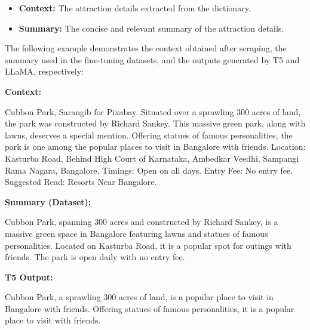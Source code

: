 \documentclass[sigconf,authordraft]{acmart}
\begin{document}
    \begin{itemize}
      \item \textbf{Context:} The attraction details extracted from the dictionary.
      \item \textbf{Summary:} The concise and relevant summary of the attraction details.
    \end{itemize}

    The following example demonstrates the context obtained after scraping, the summary used in the fine-tuning datasets, and the outputs generated by T5 and LLaMA, respectively:

    \begin{tcolorbox}[linewidth=1pt, innerleftmargin=15pt, innerrightmargin=15pt, innertopmargin=15pt, innerbottommargin=15pt]
      \textbf{Context:}

      Cubbon Park, Sarangib for Pixabay. Situated over a sprawling 300 acres of land, the park was constructed by Richard Sankey. This massive green park, along with lawns, deserves a special mention. Offering statues of famous personalities, the park is one among the popular places to visit in Bangalore with friends. Location: Kasturba Road, Behind High Court of Karnataka, Ambedkar Veedhi, Sampangi Rama Nagara, Bangalore. Timings: Open on all days. Entry Fee: No entry fee. Suggested Read: Resorts Near Bangalore.
    \end{tcolorbox}

    \begin{tcolorbox}[linewidth=1pt, innerleftmargin=15pt, innerrightmargin=15pt, innertopmargin=15pt, innerbottommargin=15pt]
      \textbf{Summary (Dataset):}

      Cubbon Park, spanning 300 acres and constructed by Richard Sankey, is a massive green space in Bangalore featuring lawns and statues of famous personalities. Located on Kasturba Road, it is a popular spot for outings with friends. The park is open daily with no entry fee.
    \end{tcolorbox}

    \begin{tcolorbox}[linewidth=1pt, innerleftmargin=15pt, innerrightmargin=15pt, innertopmargin=15pt, innerbottommargin=15pt]
      \textbf{T5 Output:}

      Cubbon Park, a sprawling 300 acres of land, is a popular place to visit in Bangalore with friends. Offering statues of famous personalities, it is a popular place to visit with friends.
    \end{tcolorbox}
\end{document}
